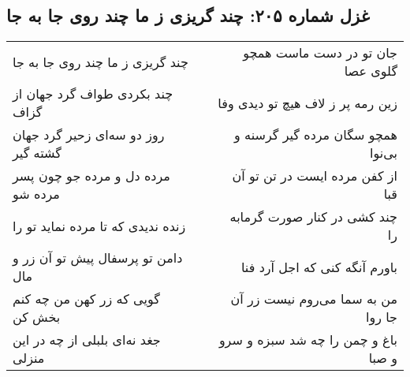 \begin{center}
\section*{غزل شماره ۲۰۵: چند گریزی ز ما چند روی جا به جا}
\label{sec:0205}
\begin{longtable}{l p{0.5cm} r}
چند گریزی ز ما چند روی جا به جا
&&
جان تو در دست ماست همچو گلوی عصا
\\
چند بکردی طواف گرد جهان از گزاف
&&
زین رمه پر ز لاف هیچ تو دیدی وفا
\\
روز دو سه‌ای زحیر گرد جهان گشته گیر
&&
همچو سگان مرده گیر گرسنه و بی‌نوا
\\
مرده دل و مرده جو چون پسر مرده شو
&&
از کفن مرده ایست در تن تو آن قبا
\\
زنده ندیدی که تا مرده نماید تو را
&&
چند کشی در کنار صورت گرمابه را
\\
دامن تو پرسفال پیش تو آن زر و مال
&&
باورم آنگه کنی که اجل آرد فنا
\\
گویی که زر کهن من چه کنم بخش کن
&&
من به سما می‌روم نیست زر آن جا روا
\\
جغد نه‌ای بلبلی از چه در این منزلی
&&
باغ و چمن را چه شد سبزه و سرو و صبا
\\
\end{longtable}
\end{center}
